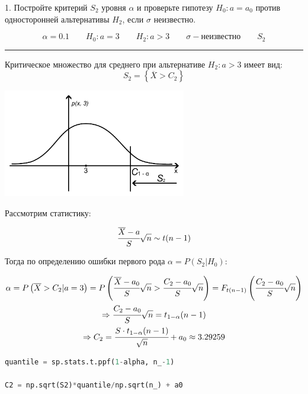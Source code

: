 \documentclass[a4paper, 14pt]{extarticle}
\begin{document}
1. Постройте критерий $S_2$ уровня $\alpha$ и проверьте гипотезу $H_0: a = a_0$ 
против односторонней альтернативы $H_2$, если  $\sigma$ неизвестно.

\begin{equation*}
    \alpha = 0.1 \qquad H_0: a = 3 \qquad H_2: a > 3 \qquad \sigma - \text{неизвестно} \qquad S_2
\end{equation*}

\rule{\linewidth}{0.1mm}

Критическое множество для среднего при альтернативе $H_2: a > 3$ имеет вид:
\begin{equation*}
    S_2 = \left\{ \overline{X} > C_2 \right\}
\end{equation*}

\begin{center}
    \includegraphics[width=0.6\textwidth]{hypo_plot}
\end{center}

Рассмотрим статистику:

\begin{equation*}
    \cfrac{\overline{X} - a}{S} \sqrt{n} \sim t(n-1)
\end{equation*}

Тогда по определению ошибки первого рода $\alpha = P(S_2 | H_0)$:

\begin{gather*}
    \alpha = P\left(\overline{X} > C_2 | a = 3\right) = 
    P\left(\cfrac{\overline{X} - a_0}{S} \sqrt{n} > 
    \cfrac{C_2 - a_0}{S} \sqrt{n}\right)
    = F_{t(n-1)} \left(\cfrac{C_2 - a_0}{S} \sqrt{n}\right) \\
    \Rightarrow \cfrac{C_2 - a_0}{S} \sqrt{n} = t_{1 - \alpha} (n-1) \\
    \Rightarrow C_2 = \cfrac{S \cdot t_{1-\alpha}(n-1)}{\sqrt{n}} + a_0 \approx 3.29259 
\end{gather*}

\begin{center}
    \begin{lstlisting}[language=Python]
quantile = sp.stats.t.ppf(1-alpha, n_-1)

C2 = np.sqrt(S2)*quantile/np.sqrt(n_) + a0
    \end{lstlisting}
\end{center}
\end{document}
